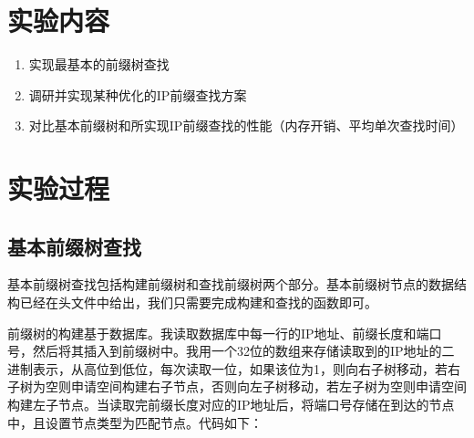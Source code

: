 \documentclass[UTF8]{report}
\begin{document}
\pagestyle{fancy}

\maketitle

\section{实验内容}

\begin{enumerate}
    \item 实现最基本的前缀树查找
    \item 调研并实现某种优化的IP前缀查找方案
    \item 对比基本前缀树和所实现IP前缀查找的性能（内存开销、平均单次查找时间）
\end{enumerate}

\section{实验过程}

\subsection{基本前缀树查找}

基本前缀树查找包括构建前缀树和查找前缀树两个部分。基本前缀树节点的数据结构已经在头文件中给出，我们只需要完成构建和查找的函数即可。

前缀树的构建基于数据库。我读取数据库中每一行的IP地址、前缀长度和端口号，然后将其插入到前缀树中。我用一个32位的数组来存储读取到的IP地址的二进制表示，从高位到低位，每次读取一位，如果该位为1，则向右子树移动，若右子树为空则申请空间构建右子节点，否则向左子树移动，若左子树为空则申请空间构建左子节点。当读取完前缀长度对应的IP地址后，将端口号存储在到达的节点中，且设置节点类型为匹配节点。代码如下：
\end{document}
